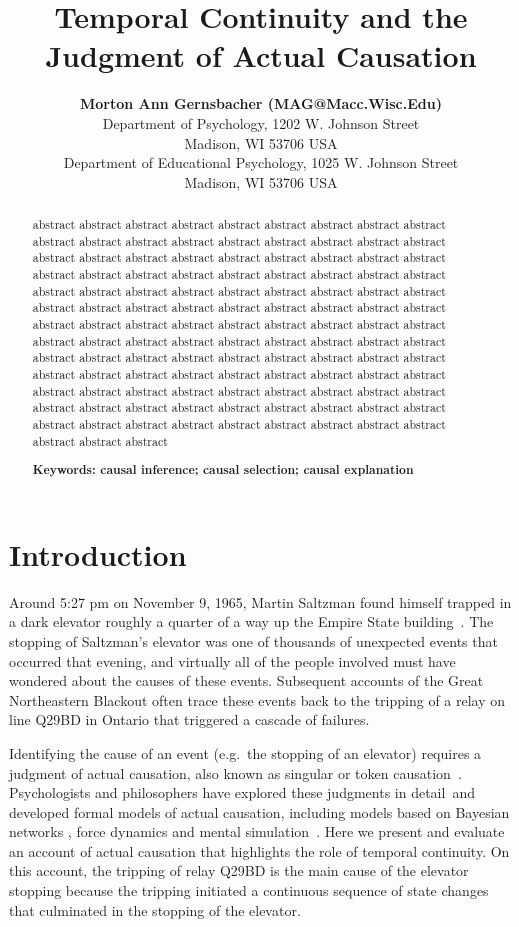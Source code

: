 \documentclass[10pt,letterpaper]{article}
\title{Temporal Continuity and the Judgment of Actual Causation}
\author{{\large \bf Morton Ann Gernsbacher (MAG@Macc.Wisc.Edu)} \\
  Department of Psychology, 1202 W. Johnson Street \\
  Madison, WI 53706 USA
  \AND {\large \bf Sharon J.~Derry (SDJ@Macc.Wisc.Edu)} \\
  Department of Educational Psychology, 1025 W. Johnson Street \\
  Madison, WI 53706 USA}
\begin{document}
\maketitle


\begin{abstract}

abstract abstract abstract abstract abstract abstract abstract abstract abstract abstract abstract abstract abstract abstract abstract abstract abstract abstract abstract abstract abstract abstract abstract abstract abstract abstract abstract abstract abstract abstract abstract abstract abstract abstract abstract abstract abstract abstract abstract abstract abstract abstract abstract abstract abstract abstract abstract abstract abstract abstract abstract abstract abstract abstract abstract abstract abstract abstract abstract abstract abstract abstract abstract abstract abstract abstract abstract abstract abstract abstract abstract abstract abstract abstract abstract abstract abstract abstract abstract abstract 
abstract abstract abstract abstract abstract abstract abstract abstract abstract abstract abstract abstract abstract abstract abstract abstract abstract abstract abstract abstract abstract abstract abstract abstract abstract abstract abstract abstract abstract abstract abstract abstract abstract abstract abstract abstract abstract abstract abstract abstract 

\textbf{Keywords: causal inference; causal selection; causal explanation} 
\end{abstract}


\section{Introduction}

Around 5:27 pm on November 9, 1965, Martin Saltzman found himself trapped in a dark elevator roughly a quarter of a way up the Empire State building~\cite{gelbr1965night}. The stopping of Saltzman's elevator was one of thousands of unexpected events that occurred that evening, and virtually all of the people involved must have wondered about the causes of these events. Subsequent accounts of the Great Northeastern Blackout often trace these events back to the tripping of a relay on line Q29BD in Ontario that triggered a cascade of failures.

Identifying the cause of an event (e.g.\ the stopping of an elevator) requires a judgment of actual causation, also known as singular or token causation~\cite{danks17}. Psychologists and philosophers have explored these judgments in detail~and developed formal models of actual causation, including models based on Bayesian networks \cite{halpern16}, force dynamics \cite{wolfft17} and mental simulation~\cite{gerstenberg20}.  Here we present and evaluate an account of actual causation that highlights the role of temporal continuity.  On this account, the tripping of relay Q29BD is the main cause of the elevator stopping because the tripping initiated a continuous sequence of state changes that culminated in the stopping of the elevator.
\end{document}
